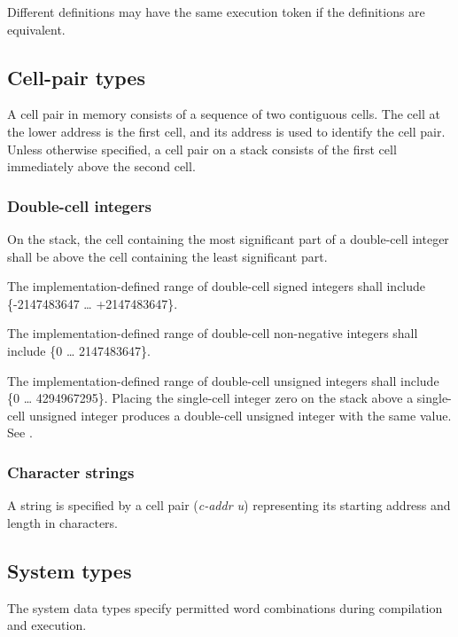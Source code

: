 Different definitions may have the same execution token if the
definitions are equivalent.

\subsection{Cell-pair types} %
\label{usage:2cell}

A cell pair in memory consists of a sequence of two contiguous
cells. The cell at the lower address is the first cell, and its
address is used to identify the cell pair. Unless otherwise
specified, a cell pair on a stack consists of the first cell
immediately above the second cell.

\subsubsection{Double-cell integers} %

On the stack, the cell containing the most significant part of a
double-cell integer shall be above the cell containing the least
significant part.

The implementation-defined range of double-cell signed integers
shall include \{-2147483647 {\ldots} \newline +2147483647\}.

The implementation-defined range of double-cell non-negative
integers shall include \{0 {\ldots} 2147483647\}.

The implementation-defined range of double-cell unsigned integers
shall include \{0 {\ldots} 4294967295\}. Placing the single-cell
integer zero on the stack above a single-cell unsigned integer
produces a double-cell unsigned integer with the same value.
See .

\subsubsection{Character strings} %

A string is specified by a cell pair (\emph{c-addr u}) representing
its starting address and length in characters.

\subsection{System types} %

The system data types specify permitted word combinations during
compilation and execution.

